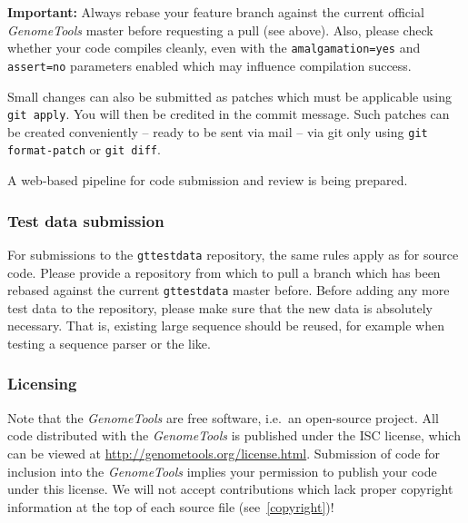 \documentclass[11pt,final]{article}
\newcommand{\keyword}[1]{\lstinline{#1}}
\newcommand{\Gt}[0]{\emph{GenomeTools}\xspace}
\begin{document}
\textbf{Important:} Always rebase your feature branch against the current
official \Gt master before requesting a pull (see above). Also, please check
whether your code compiles cleanly, even with the \keyword{amalgamation=yes}
and \keyword{assert=no} parameters enabled which may influence compilation
success.

Small changes can also be submitted as patches which must be applicable using
\keyword{git apply}. You will then be credited in the commit message. Such
patches can be created conveniently -- ready to be sent via mail -- via git
only using \keyword{git format-patch} or \keyword{git diff}.

A web-based pipeline for code submission and review is being prepared. 

\subsubsection{Test data submission}

For submissions to the \keyword{gttestdata} repository, the same rules apply
as for source code. Please provide a repository from which to pull a branch
which has been rebased against the current \keyword{gttestdata} master before.
Before adding any more test data to the repository, please make sure that
the new data is absolutely necessary. That is, existing large sequence should be
reused, for example when testing a sequence parser or the like.

\subsubsection{Licensing}

Note that the \Gt are free software, i.e.\ an open-source project.
All code distributed with the \Gt is published under the ISC license,
which can be viewed at \url{http://genometools.org/license.html}. Submission of
code for inclusion into the \Gt implies your permission to publish your code
under this license. We will not accept contributions which lack proper
copyright information at the top of each source file (see~\ref{copyright})!
\end{document}
